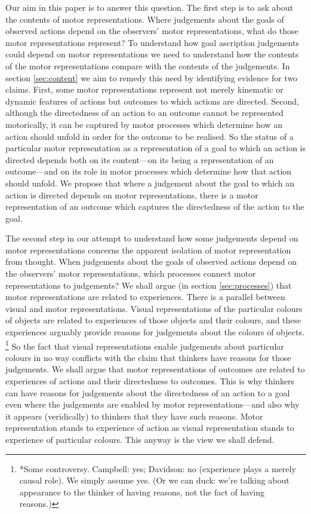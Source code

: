 \documentclass[12pt,\papersize]{extarticle}
\begin{document}
Our aim in this paper is to answer this question. 
The first step is to ask about the contents of motor representations.
Where judgements about the goals of observed actions depend on the observers' motor representations, what do those motor representations represent?
To understand how goal ascription judgements could depend on motor representations we need to understand how the contents of the motor representations compare with the contents of the judgements.
In section \vref{sec:content} we aim to remedy this need by identifying evidence for two claims. First, some motor representations represent not merely kinematic or dynamic features of actions but outcomes to which actions are directed. Second, although the directedness of an action to an outcome cannot be represented motorically, it can be captured by motor processes which determine how an action should unfold in order for the outcome to be realised. So the status of a particular motor representation as a representation of a goal to which an action is directed depends both on its content---on its being a representation of an outcome---and on its role in motor processes which determine how that action should unfold.
We propose that where a judgement about the goal to which an action is directed depends on motor representations, there is a motor representation of an outcome which captures the directedness of the action to the goal.

The second step in our attempt to understand how some judgements depend on motor representations concerns the apparent isolation of motor representation from thought. When judgements about the goals of observed actions depend on the observers' motor representations, which processes connect motor representations to judgements?
We shall argue (in section \vref{sec:processes}) that motor representations are related to experiences.  There is a parallel between visual and motor representations. Visual representations of the particular colours of objects are related to experiences of those objects and their colours, and these experiences arguably provide reasons for judgements about the colours of objects.%
\footnote{
*Some controversy.  Campbell: yes; Davidson: no (experience plays a merely causal role).  We simply assume yes.  (Or we can duck: we're talking about appearance to the thinker of having reasons, not the fact of having reasons.)}
So the fact that visual representations enable judgements about particular colours in no way conflicts with the claim that thinkers have reasons for those judgements.  We shall argue that motor representations of outcomes are related to experiences of actions and their directedness to outcomes.  This is why thinkers can have reasons for judgements about the directedness of an action to a goal even where the judgements are enabled by motor representations---and also why it appears (veridically) to thinkers that they have such reasons.  Motor representation stands to experience of action as visual representation stands to experience of particular colours. This anyway is the view we shall defend.
\end{document}
